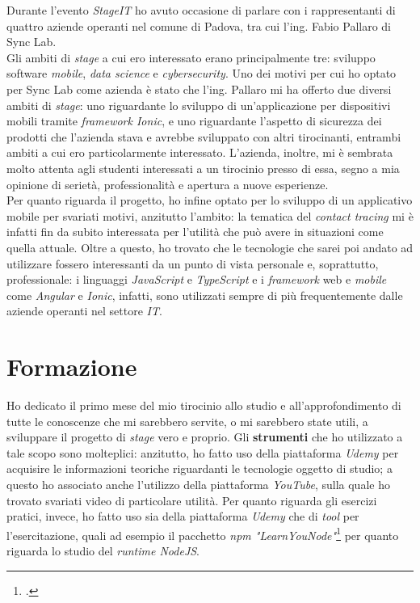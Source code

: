 Durante l'evento \textit{StageIT} ho avuto occasione di parlare con i rappresentanti di quattro aziende operanti nel comune di Padova, tra cui l'ing. Fabio Pallaro di Sync Lab. \\
Gli ambiti di \textit{stage} a cui ero interessato erano principalmente tre: sviluppo software \textit{mobile}, \textit{data science} e \textit{cybersecurity}. Uno dei motivi per cui ho optato per Sync Lab come azienda è stato che l'ing. Pallaro mi ha offerto due diversi ambiti di \textit{stage}: uno riguardante lo sviluppo di un'applicazione per dispositivi mobili tramite \textit{framework Ionic}, e uno riguardante l'aspetto di sicurezza dei prodotti che l'azienda stava e avrebbe sviluppato con altri tirocinanti, entrambi ambiti a cui ero particolarmente interessato. L'azienda, inoltre, mi è sembrata molto attenta agli studenti interessati a un tirocinio presso di essa, segno a mia opinione di serietà, professionalità e apertura a nuove esperienze. \\
Per quanto riguarda il progetto, ho infine optato per lo sviluppo di un applicativo mobile per svariati motivi, anzitutto l'ambito: la tematica del \textit{contact tracing} mi è infatti fin da subito interessata per l'utilità che può avere in situazioni come quella attuale. Oltre a questo, ho trovato che le tecnologie che sarei poi andato ad utilizzare fossero interessanti da un punto di vista personale e, soprattutto, professionale: i linguaggi \textit{JavaScript} e \textit{TypeScript} e i \textit{framework} web e \textit{mobile} come \textit{Angular} e \textit{Ionic}, infatti, sono utilizzati sempre di più frequentemente dalle aziende operanti nel settore \textit{IT}.


\section{Formazione}

Ho dedicato il primo mese del mio tirocinio allo studio e all'approfondimento di tutte le conoscenze che mi sarebbero servite, o mi sarebbero state utili, a sviluppare il progetto di \textit{stage} vero e proprio. Gli \textbf{strumenti} che ho utilizzato a tale scopo sono molteplici: anzitutto, ho fatto uso della piattaforma \textit{Udemy} per acquisire le informazioni teoriche riguardanti le tecnologie oggetto di studio; a questo ho associato anche l'utilizzo della piattaforma \textit{YouTube}, sulla quale ho trovato svariati video di particolare utilità. Per quanto riguarda gli esercizi pratici, invece, ho fatto uso sia della piattaforma \textit{Udemy} che di \textit{tool} per l'esercitazione, quali ad esempio il pacchetto \textit{npm "LearnYouNode"}\footcite{tec:learnyounode} per quanto riguarda lo studio del \textit{runtime NodeJS}. \\

